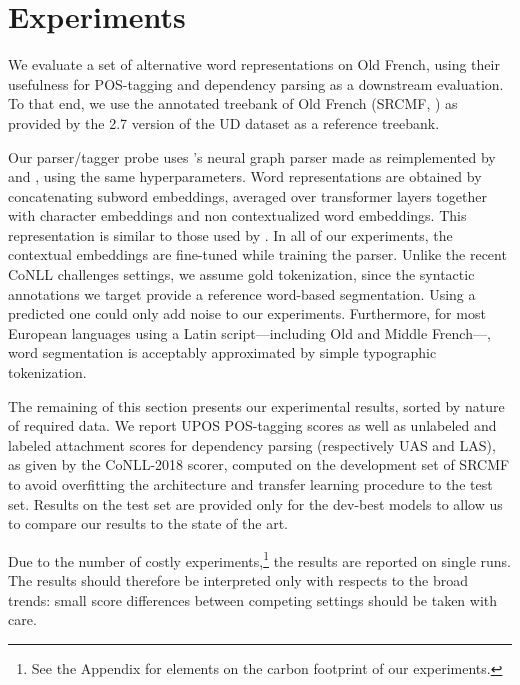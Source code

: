 \section{Experiments}
\label{sec-experiments}
We evaluate a set of alternative word representations on Old French, using their usefulness for POS-tagging and dependency parsing as a downstream evaluation.
To that end, we use the annotated treebank of Old French (SRCMF,  \citet{prevost-stein-2013-syntactic}) as provided by the 2.7 version of the UD dataset \citep{zeman-etal-2020-universal} as a reference treebank.

Our parser/tagger probe uses \citet{dozat-manning-2018-simpler}'s neural graph parser made as reimplemented by \citet{le-etal-2020-flaubert} and \citet{grobol-crabbe-2021-analyse}, using the same hyperparameters.
Word representations are obtained by concatenating subword embeddings, averaged over transformer layers together with character embeddings and non contextualized word embeddings.  %
This representation is similar to those used by \citet{straka-strakova-2019-evaluating,ling-etal-2015-finding}.
In all of our experiments, the contextual embeddings are fine-tuned while training the parser.
Unlike the recent CoNLL challenges settings, we assume gold tokenization, since the syntactic annotations we target provide a reference word-based segmentation. Using a predicted one could only add noise to our experiments.
Furthermore, for most European languages using a Latin script---including Old and Middle French---, word segmentation is acceptably approximated by simple typographic tokenization.

The remaining of this section presents our experimental results, sorted by nature of required data.
We report UPOS POS-tagging scores as well as unlabeled and labeled attachment scores for dependency parsing (respectively UAS and LAS), as given by the CoNLL-2018 scorer, computed on the development set of SRCMF to avoid overfitting the architecture and transfer learning procedure to the test set.
Results on the test set are provided only for the dev-best models to allow us to compare our results to the state of the art.

Due to the number of costly experiments,\footnote{See the Appendix for elements on the carbon footprint of our experiments.} the results are reported on single runs.
The results should therefore be interpreted  only with respects to the broad trends: small score differences between competing settings should be taken with care.

